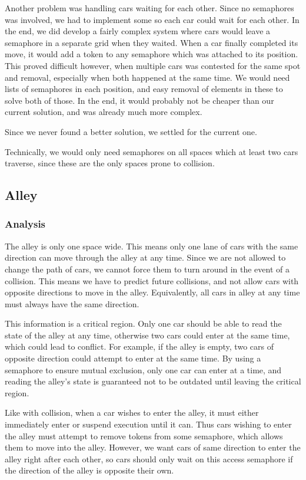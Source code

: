 Another problem was handling cars waiting for each other. Since no semaphores was involved, we had to implement some so each car could wait for each other. In the end, we did develop a fairly complex system where cars would leave a semaphore in a separate grid when they waited. When a car finally completed its move, it would add a token to any semaphore which was attached to its position. This proved difficult however, when multiple cars was contested for the same spot and removal, especially when both happened at the same time. We would need lists of semaphores in each position, and easy removal of elements in these to solve both of those. In the end, it would probably not be cheaper than our current solution, and was already much more complex.

Since we never found a better solution, we settled for the current one.

Technically, we would only need semaphores on all spaces which at least two cars traverse, since these are the only spaces prone to collision.

\subsection{Alley}
\subsubsection{Analysis}
The alley is only one space wide. This means only one lane of cars with the same direction can move through the alley at any time. Since we are not allowed to change the path of cars, we cannot force them to turn around in the event of a collision. This means we have to predict future collisions, and not allow cars with opposite directions to move in the alley. Equivalently, all cars in alley at any time must always have the same direction.

This information is a critical region. Only one car should be able to read the state of the alley at any time, otherwise two cars could enter at the same time, which could lead to conflict. For example, if the alley is empty, two cars of opposite direction could attempt to enter at the same time. By using a semaphore to ensure mutual exclusion, only one car can enter at a time, and reading the alley's state is guaranteed not to be outdated until leaving the critical region.

Like with collision, when a car wishes to enter the alley, it must either immediately enter or suspend execution until it can. Thus cars wishing to enter the alley must attempt to remove tokens from some semaphore, which allows them to move into the alley. However, we want cars of same direction to enter the alley right after each other, so cars should only wait on this access semaphore if the direction of the alley is opposite their own.

